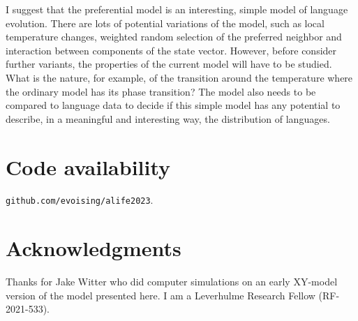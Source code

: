 \documentclass[letterpaper]{article}
\begin{document}
I suggest that the preferential model is an interesting, simple model of language evolution. There are lots of potential variations of the model, such as local temperature changes, weighted random selection of the preferred neighbor and interaction between components of the state vector. However, before consider further variants, the properties of the current model will have to be studied. What is the nature, for example, of the transition around the temperature where the ordinary model has its phase transition? The model also needs to be compared to language data to decide if this simple model has any potential to describe, in a meaningful and interesting way, the distribution of languages. 

\section{Code availability}
\texttt{github.com/evoising/alife2023}.
\section{Acknowledgments}
Thanks for Jake Witter who did computer simulations on an early XY-model version of the model presented here. I am a Leverhulme Research Fellow (RF-2021-533).
\newpage
\footnotesize

 
\end{document}
